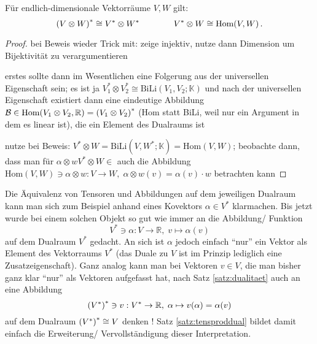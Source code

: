 \documentclass[../H_Analysis_main.tex]{subfiles}
\begin{document}
\begin{satz}\label{satz:tensproddual}
Für endlich-dimensionale Vektorräume $V, W$ gilt:
\begin{equation}
\qty(V \otimes W)^* \cong V^* \otimes W^* \qquad \qquad V^* \otimes W \cong \text{Hom}(V, W) \, .
\end{equation}
\end{satz}
\begin{proof}
bei Beweis wieder Trick mit: zeige injektiv, nutze dann Dimension um Bijektivität zu verargumentieren

erstes sollte dann im Wesentlichen eine Folgerung aus der universellen Eigenschaft sein; es ist ja $V_1^* \otimes V_2^* \cong \text{BiLi}(V_1, V_2; \mathbb{K})$ und nach der universellen Eigenschaft existiert dann eine eindeutige Abbildung $\mathcal{B} \in \text{Hom}(V_1 \otimes V_2, \mathbb{R}) = \qty(V_1 \otimes V_2)^*$ (Hom statt BiLi, weil nur ein Argument in dem es linear ist), die ein Element des Dualraums ist

nutze bei Beweis: $V^* \otimes W = \text{BiLi}(V, W^*; \mathbb{K}) = \text{Hom}(V, W)$; beobachte dann, dass man für $\alpha \otimes w V^* \otimes W \in $ auch die Abbildung $\text{Hom}(V, W) \ni \alpha \otimes w: V \rightarrow W, \; \alpha \otimes w (v) = \alpha(v) \cdot w$ betrachten kann
\end{proof}

Die Äquivalenz von Tensoren und Abbildungen auf dem jeweiligen Dualraum kann man sich zum Beispiel anhand eines Kovektors $\alpha \in V^*$ klarmachen. Bis jetzt wurde bei einem solchen Objekt so gut wie immer an die Abbildung/ Funktion
\begin{equation*}
V^* \ni \alpha: V \rightarrow \mathbb{R}, \; v \mapsto \alpha(v)
\end{equation*}
auf dem Dualraum $V^*$ gedacht. An sich ist $\alpha$ jedoch einfach \enquote{nur} ein Vektor als Element des Vektorraums $V^*$ (das Duale zu $V$ ist im Prinzip lediglich eine Zusatzeigenschaft). Ganz analog kann man bei Vektoren $v \in V$, die man bisher ganz klar \enquote{nur} als Vektoren aufgefasst hat, nach Satz \ref{satz:dualitaet} auch an eine Abbildung
\begin{equation*}
\qty(V^*)^* \ni v: V^* \rightarrow \mathbb{R}, \; \alpha \mapsto v(\alpha) = \alpha(v)
\end{equation*}
auf dem Dualraum $\qty(V^*)^* \cong V$ denken ! Satz \ref{satz:tensproddual} bildet damit einfach die Erweiterung/ Vervollständigung dieser Interpretation.
\end{document}
